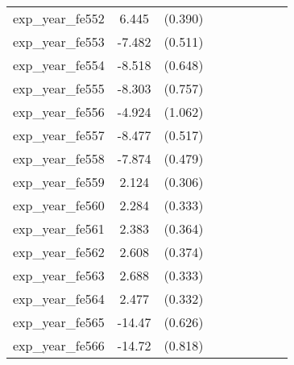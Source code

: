 {\begin{tabular}{l*{4}{cc}}
exp\_year\_fe552&    6.445\sym{***}&  (0.390)&                  &         &                  &         &                  &         \\
exp\_year\_fe553&   -7.482\sym{***}&  (0.511)&                  &         &                  &         &                  &         \\
exp\_year\_fe554&   -8.518\sym{***}&  (0.648)&                  &         &                  &         &                  &         \\
exp\_year\_fe555&   -8.303\sym{***}&  (0.757)&                  &         &                  &         &                  &         \\
exp\_year\_fe556&   -4.924\sym{***}&  (1.062)&                  &         &                  &         &                  &         \\
exp\_year\_fe557&   -8.477\sym{***}&  (0.517)&                  &         &                  &         &                  &         \\
exp\_year\_fe558&   -7.874\sym{***}&  (0.479)&                  &         &                  &         &                  &         \\
exp\_year\_fe559&    2.124\sym{***}&  (0.306)&                  &         &                  &         &                  &         \\
exp\_year\_fe560&    2.284\sym{***}&  (0.333)&                  &         &                  &         &                  &         \\
exp\_year\_fe561&    2.383\sym{***}&  (0.364)&                  &         &                  &         &                  &         \\
exp\_year\_fe562&    2.608\sym{***}&  (0.374)&                  &         &                  &         &                  &         \\
exp\_year\_fe563&    2.688\sym{***}&  (0.333)&                  &         &                  &         &                  &         \\
exp\_year\_fe564&    2.477\sym{***}&  (0.332)&                  &         &                  &         &                  &         \\
exp\_year\_fe565&   -14.47\sym{***}&  (0.626)&                  &         &                  &         &                  &         \\
exp\_year\_fe566&   -14.72\sym{***}&  (0.818)&                  &         &                  &         &                  &         \\

\end{tabular}}
